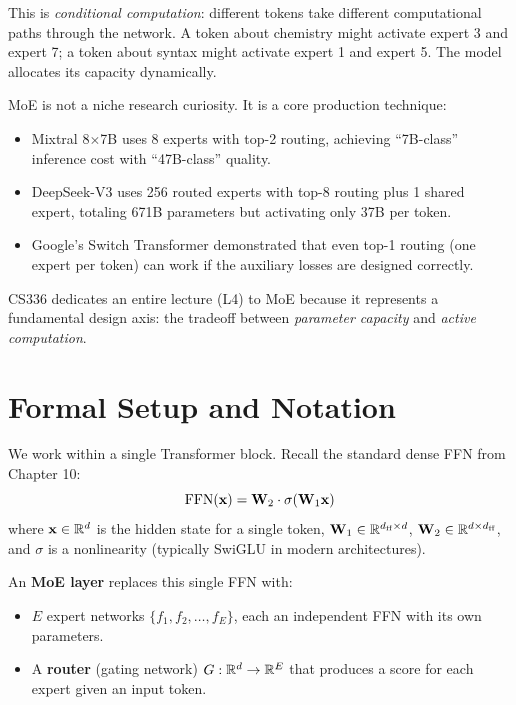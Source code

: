 This is \emph{conditional computation}: different tokens take different computational paths through the network. A token about chemistry might activate expert 3 and expert 7; a token about syntax might activate expert 1 and expert 5. The model allocates its capacity dynamically.

MoE is not a niche research curiosity. It is a core production technique:
\begin{itemize}
  \item Mixtral 8$\times$7B uses 8 experts with top-2 routing, achieving ``7B-class'' inference cost with ``47B-class'' quality.
  \item DeepSeek-V3 uses 256 routed experts with top-8 routing plus 1 shared expert, totaling 671B parameters but activating only 37B per token.
  \item Google's Switch Transformer demonstrated that even top-1 routing (one expert per token) can work if the auxiliary losses are designed correctly.
\end{itemize}

CS336 dedicates an entire lecture (L4) to MoE because it represents a fundamental design axis: the tradeoff between \emph{parameter capacity} and \emph{active computation}.

\section{Formal Setup and Notation}
\label{ch:13:sec:setup}

We work within a single Transformer block. Recall the standard dense FFN from Chapter 10:
\begin{equation}
\operatorname{FFN}(\mathbf{x}) = \mathbf{W}_2 \cdot \sigma(\mathbf{W}_1 \mathbf{x})
\end{equation}
where $\mathbf{x} \in \mathbb{R}^d$ is the hidden state for a single token, $\mathbf{W}_1 \in \mathbb{R}^{d_{\text{ff}} \times d}$, $\mathbf{W}_2 \in \mathbb{R}^{d \times d_{\text{ff}}}$, and $\sigma$ is a nonlinearity (typically SwiGLU in modern architectures).

An \textbf{MoE layer} replaces this single FFN with:
\begin{itemize}
  \item $E$ expert networks $\{f_1, f_2, \ldots, f_E\}$, each an independent FFN with its own parameters.
  \item A \textbf{router} (gating network) $G: \mathbb{R}^d \to \mathbb{R}^E$ that produces a score for each expert given an input token.
\end{itemize}

